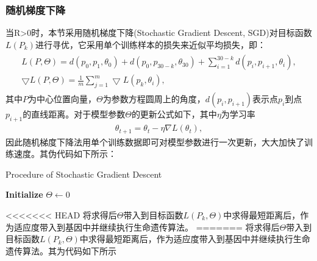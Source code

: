 \documentclass{whutmod}
\begin{document}
\begin{table}[H]
\begin{tablenotes}
	\subsubsection{随机梯度下降}	
    	 当R>0时，本节采用随机梯度下降(Stochastic Gradient Descent, SGD)对目标函数$L(P_k)$进行寻优，它采用单个训练样本的损失来近似平均损失，即：
    	 	    \begin{gather}
    	 \begin{matrix}
    	 L(P,\Theta)=d(p_0,p_{1},\theta_0)+d(p_0,p_{30-k},\theta_{30})+\sum_{i=1}^{30-k}d(p_i,p_{i+1},\theta_{i}) ,\\ 
    	 \bigtriangledown  L(P,\Theta)= \frac{1}{m}\sum_{j=1}^{m}\bigtriangledown L(p_k,\theta_{i}),
    	 \end{matrix}
    	 \end{gather}
    	 其中$P$为中心位置向量，$\Theta$为参数方程圆周上的角度，$d(p_i,p_{i+1})$表示点$p_i$到点$p_{i+1}$的直线距离。对于模型参数$\Theta$的更新公式如下，其中$\eta$为学习率
    	 \begin{gather}
			\theta_{t+1}=\theta_{t}-\eta \nabla L\left(\theta_{t}\right),
    	 \end{gather}
    	 因此随机梯度下降法用单个训练数据即可对模型参数进行一次更新，大大加快了训练速度。其伪代码如下所示：
    	 
    	   	\begin{algorithm}[H]
    	 	\caption{Procedure of Stochastic Gradient Descent}
    	 	\LinesNumbered
    	 	\textbf{Initialize} $\Theta \leftarrow 0$ \newline
    	 	\Return {$\Theta$ }
    	 \end{algorithm}
		
<<<<<<< HEAD
		将求得后$\Theta$带入到目标函数$L(P_k, \Theta)$中求得最短距离后，作为适应度带入到基因中并继续执行生命遗传算法。	
=======
		将求得后$\Theta$带入到目标函数$L(P_k, \Theta)$中求得最短距离后，作为适应度带入到基因中并继续执行生命遗传算法。其为代码如下所示
		

\end{tablenotes}
\end{table}
\end{document}
